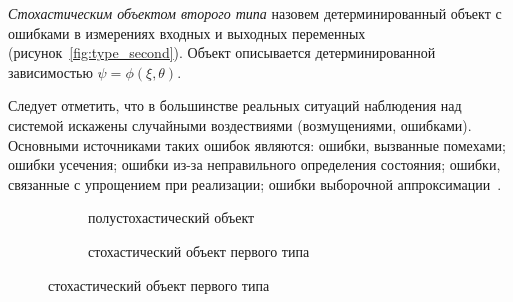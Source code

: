 \emph{Стохастическим объектом второго типа} назовем детерминированный объект с ошибками
в измерениях входных и выходных переменных (рисунок~\ref{fig:type_second}).
Объект описывается детерминированной зависимостью \( \psi = \phi(\xi, \theta) \).

Следует отметить, что в большинстве реальных ситуаций наблюдения над
системой искажены случайными воздествиями (возмущениями, ошибками).
Основными источниками таких ошибок являются:
ошибки, вызванные помехами;
ошибки усечения;
ошибки из-за неправильного определения состояния;
ошибки, связанные с упрощением при реализации;
ошибки выборочной аппроксимации~\cite{eikhoff_1975}.

\begin{figure}[p]
  \begin{subfigure}[b]{\linewidth}
    \centering
    \caption{полустохастический объект}\label{fig:type_half}
  \end{subfigure}

  \vspace{2\baselineskip}
  \begin{subfigure}[b]{\linewidth}
    \centering
    \caption{стохастический объект первого типа}\label{fig:type_first}
  \end{subfigure}


\end{figure}
